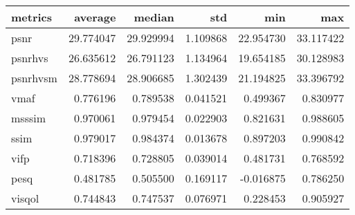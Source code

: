 \begin{tabular}{lrrrrr}
\toprule
metrics & average & median & std & min & max \\
\midrule
psnr & 29.774047 & 29.929994 & 1.109868 & 22.954730 & 33.117422 \\
psnrhvs & 26.635612 & 26.791123 & 1.134964 & 19.654185 & 30.128983 \\
psnrhvsm & 28.778694 & 28.906685 & 1.302439 & 21.194825 & 33.396792 \\
vmaf & 0.776196 & 0.789538 & 0.041521 & 0.499367 & 0.830977 \\
msssim & 0.970061 & 0.979454 & 0.022903 & 0.821631 & 0.988605 \\
ssim & 0.979017 & 0.984374 & 0.013678 & 0.897203 & 0.990842 \\
vifp & 0.718396 & 0.728805 & 0.039014 & 0.481731 & 0.768592 \\
pesq & 0.481785 & 0.505500 & 0.169117 & -0.016875 & 0.786250 \\
visqol & 0.744843 & 0.747537 & 0.076971 & 0.228453 & 0.905927 \\
\bottomrule
\end{tabular}
